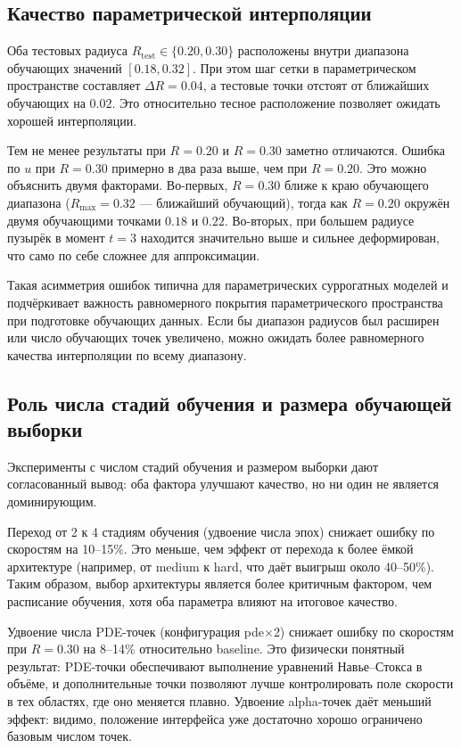 \documentclass[12pt,a4paper]{article}
\begin{document}
\subsection{Качество параметрической интерполяции}

Оба тестовых радиуса \(R_{\mathrm{test}}\in\{0.20,0.30\}\) расположены внутри
диапазона обучающих значений \([0.18, 0.32]\). При этом шаг сетки в
параметрическом пространстве составляет \(\Delta R = 0.04\), а тестовые точки
отстоят от ближайших обучающих на \(0.02\). Это относительно тесное расположение
позволяет ожидать хорошей интерполяции.

Тем не менее результаты при \(R=0.20\) и \(R=0.30\) заметно отличаются.
Ошибка по \(u\) при \(R=0.30\) примерно в два раза выше, чем при \(R=0.20\).
Это можно объяснить двумя факторами. Во-первых, \(R=0.30\) ближе к краю
обучающего диапазона (\(R_{\max}=0.32\) --- ближайший обучающий), тогда как
\(R=0.20\) окружён двумя обучающими точками \(0.18\) и \(0.22\). Во-вторых,
при большем радиусе пузырёк в момент \(t=3\) находится значительно выше и
сильнее деформирован, что само по себе сложнее для аппроксимации.

Такая асимметрия ошибок типична для параметрических суррогатных моделей и
подчёркивает важность равномерного покрытия параметрического пространства при
подготовке обучающих данных. Если бы диапазон радиусов был расширен или число
обучающих точек увеличено, можно ожидать более равномерного качества
интерполяции по всему диапазону.

\subsection{Роль числа стадий обучения и размера обучающей выборки}

Эксперименты с числом стадий обучения и размером выборки дают согласованный
вывод: оба фактора улучшают качество, но ни один не является доминирующим.

Переход от 2 к 4 стадиям обучения (удвоение числа эпох) снижает ошибку по
скоростям на 10--15\%. Это меньше, чем эффект от перехода к более ёмкой
архитектуре (например, от medium к hard, что даёт выигрыш около 40--50\%).
Таким образом, выбор архитектуры является более критичным фактором, чем
расписание обучения, хотя оба параметра влияют на итоговое качество.

Удвоение числа PDE-точек (конфигурация pde$\times$2) снижает ошибку по
скоростям при \(R=0.30\) на 8--14\% относительно baseline. Это физически
понятный результат: PDE-точки обеспечивают выполнение уравнений Навье--Стокса
в объёме, и дополнительные точки позволяют лучше контролировать поле скорости в
тех областях, где оно меняется плавно. Удвоение alpha-точек даёт меньший эффект:
видимо, положение интерфейса уже достаточно хорошо ограничено базовым числом
точек.
\end{document}
